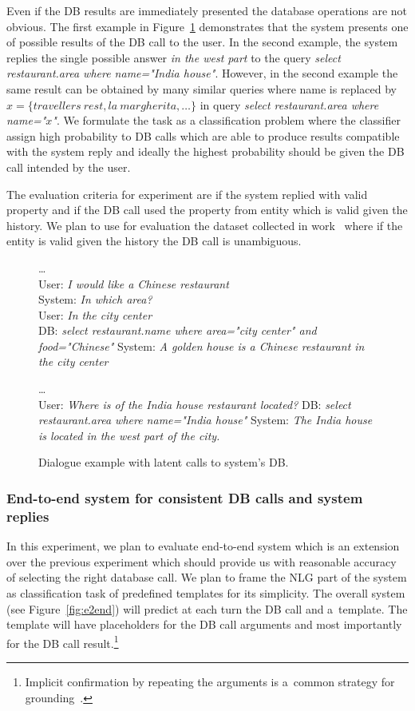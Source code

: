 \documentclass[11pt]{article}
\def\sys#1{{\color{purple}System: \it #1}}
\def\usr#1{{\color{brown}User: \it #1}}
\def\api#1{{\color{green}DB: \it #1}}
\begin{document}
Even if the DB results are immediately presented the database operations are not obvious.  
The first example in Figure~\ref{fig:apicall} demonstrates that the system presents one of possible results of the DB call to the user.
In the second example, the system replies the single possible answer {\it in the west part} to the query {\it select restaurant.area where name="India house"}.
However, in the second example the same result can be obtained by many similar queries where name is replaced by $x=\{travellers\ rest, la\ margherita, \ldots\}$ in query {\it select restaurant.area where name="$x$"}.
We formulate the task as a classification problem where the classifier assign high probability to DB calls which are able to produce results compatible with the system reply and ideally the highest probability should be given the DB call intended by the user.

The evaluation criteria for experiment are if the system replied with valid property and if the DB call used the property from entity which is valid given the history.
We plan to use for evaluation the dataset collected in work~\cite{platek2016wochat} where if the entity is valid given the history the DB call is unambiguous. 

\begin{figure}
    \dots \\
    \usr{I would like a Chinese restaurant} \\
    \sys{In which area?} \\
    \usr{In the city center} \\
    \api{select restaurant.name where area="city center" and food="Chinese"}
    \sys{A golden house is a Chinese restaurant in the city center} 

    \dots \\
    \usr{Where is of the India house restaurant located?}
    \api{select restaurant.area where name="India house"}
    \sys{The India house is located in the west part of the city.}
    \caption{Dialogue example with latent calls to system's DB.}
    \label{fig:apicall}
\end{figure}


\subsubsection*{End-to-end system for consistent DB calls and system replies}
In this experiment, we plan to evaluate end-to-end system which is an extension over the previous experiment which should provide us with reasonable accuracy of selecting the right database call.
We plan to frame the NLG part of the system as classification task of predefined templates for its simplicity.
The overall system (see Figure~\ref{fig:e2end}) will predict at each turn the DB call and a~template.
The template will have placeholders for the DB call arguments and most importantly for the DB call result.\footnote{Implicit confirmation by repeating the arguments is a~common strategy for grounding~\cite{meena_crowdsourcing_2014}.}
\end{document}
